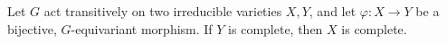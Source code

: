 Let $G$ act transitively on two irreducible varieties $X, Y$, and let $\varphi: X \rightarrow Y$ be a bijective, $G$-equivariant morphism. If $Y$ is complete, then $X$ is complete.
